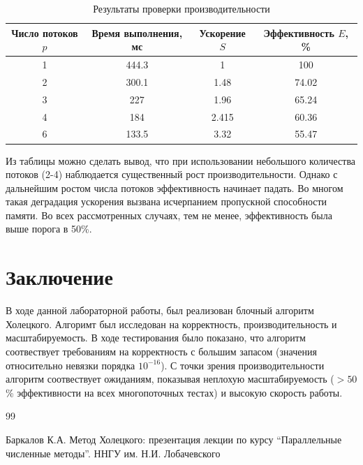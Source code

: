 \documentclass[11pt, a4paper]{article}
\def\newsection#1{
    \section{#1}
}
\begin{document}
\begin{table}[H]
    \centering
    \begin{tabular}{| c | c | c | c |}
        \hline
        Число потоков $p$ & Время выполнения, мс & Ускорение $S$ & Эффективность $E$, \% \\
        \hline
        1 & 444.3 & 1 & 100 \\
        2 & 300.1 & 1.48 & 74.02 \\
        3 & 227 & 1.96 & 65.24 \\
        4 & 184 & 2.415 & 60.36 \\
        6 & 133.5 & 3.32 & 55.47 \\
        \hline
    \end{tabular}
    \caption{Результаты проверки производительности}
    \label{table:2}
\end{table}

Из таблицы можно сделать вывод, что при использовании небольшого количества потоков (2-4) наблюдается существенный рост производительности.
Однако с дальнейшим ростом числа потоков эффективность начинает падать. Во многом такая деградация ускорения вызвана исчерпанием
пропускной способности памяти. Во всех рассмотренных случаях, тем не менее, эффективность была выше порога в 50\%.

\newsection{Заключение}
В ходе данной лабораторной работы, был реализован блочный алгоритм Холецкого. Алгоримт был исследован на корректность, производительность
и масштабируемость. В ходе тестирования было показано, что алгоритм соотвествует требованиям на корректность с большим запасом (значения
относительно невязки порядка $10^{-16}$). С точки зрения производительности алгоритм соотвествует ожиданиям, показывая 
неплохую масштабируемость ($>50$\% эффективности на всех многопоточных тестах) и высокую скорость работы.

\begin{thebibliography}{99}

    Баркалов К.А. Метод Холецкого: презентация лекции по курсу ``Параллельные численные методы''. ННГУ им. Н.И. Лобачевского

\end{thebibliography}
\newpage

\appendix
\end{document}
